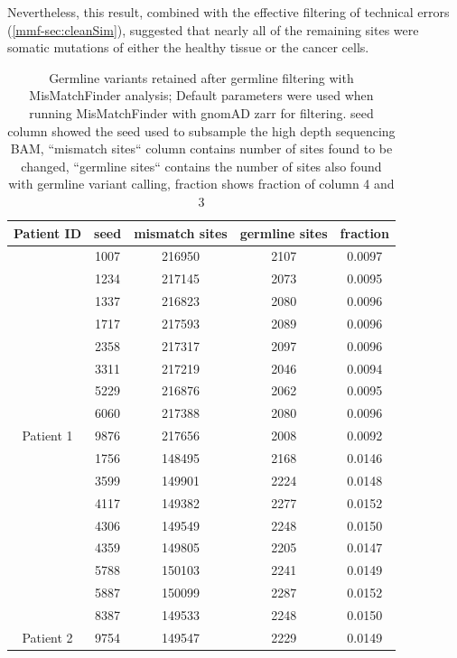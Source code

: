 Nevertheless, this result, combined with the effective filtering of technical errors (\autoref{mmf-sec:cleanSim}), suggested that nearly all of the remaining sites were somatic mutations of either the healthy tissue or the cancer cells.

\begin{table}
\caption[Germline variants retained after germline filtering]{Germline variants retained after germline filtering with MisMatchFinder analysis; Default parameters were used when running MisMatchFinder with gnomAD zarr for filtering. seed column showed the seed used to subsample the high depth sequencing BAM, ``mismatch sites`` column contains number of sites found to be changed, ``germline sites`` contains the number of sites also found with germline variant calling, fraction shows fraction of column 4 and 3}\label{tab:mmf-germlineArtifacts}
\centering
\begin{tabular}{|c|c|c|c|c|}
\toprule
\hline
\textbf{Patient ID} & \textbf{seed} & \textbf{mismatch sites} & \textbf{germline sites} & \textbf{fraction} \\
\hline
 & \num{1007} & \num{216950} &  \num{2107} & \num{0.0097}\\ 
 & \num{1234} & \num{217145} &  \num{2073} & \num{0.0095}\\ 
 & \num{1337} & \num{216823} &  \num{2080} & \num{0.0096}\\ 
 & \num{1717} & \num{217593} &  \num{2089} & \num{0.0096}\\ 
 & \num{2358} & \num{217317} &  \num{2097} & \num{0.0096}\\ 
 & \num{3311} & \num{217219} &  \num{2046} & \num{0.0094}\\ 
 & \num{5229} & \num{216876} &  \num{2062} & \num{0.0095}\\ 
 & \num{6060} & \num{217388} &  \num{2080} & \num{0.0096}\\ 
\multirow{-9}{*}{Patient 1} & \num{9876} & \num{217656} &  \num{2008} & \num{0.0092}\\ 
\hline
 & \num{1756} & \num{148495} &  \num{2168} & \num{0.0146}\\ 
 & \num{3599} & \num{149901} &  \num{2224} & \num{0.0148}\\ 
 & \num{4117} & \num{149382} &  \num{2277} & \num{0.0152}\\ 
 & \num{4306} & \num{149549} &  \num{2248} & \num{0.0150}\\ 
 & \num{4359} & \num{149805} &  \num{2205} & \num{0.0147}\\ 
 & \num{5788} & \num{150103} &  \num{2241} & \num{0.0149}\\ 
 & \num{5887} & \num{150099} &  \num{2287} & \num{0.0152}\\ 
 & \num{8387} & \num{149533} &  \num{2248} & \num{0.0150}\\ 
\multirow{-9}{*}{Patient 2} & \num{9754} & \num{149547} &  \num{2229} & \num{0.0149}\\
\hline
\bottomrule
\end{tabular}
\end{table}


